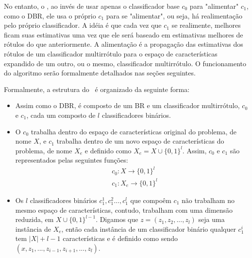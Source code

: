 No entanto, o \MRLMa, ao invés de usar apenas o classificador base $c_0$ para "alimentar" $c_1$, como o DBR,
ele usa o próprio $c_1$ para se "alimentar", ou seja, há realimentação pelo próprio classificador.
A idéia é que cada vez que $c_1$ se realimente, melhores ficam suas estimativas uma vez que ele será baseado
em estimativas melhores de rótulos do que anteriormente. 
A alimentação é a propagação das 
estimativas dos rótulos de um classificador multirrótulo para o espaço de características expandido de um outro, ou o mesmo,
classificador multirrótulo. O funcionamento do algoritmo serão formalmente detalhados nas seções seguintes.

Formalmente, a estrutura do \MRLMa~é organizado da seguinte forma:
\begin{itemize}
  \item Assim como o DBR, é composto de um BR e um classificador multirrótulo, $c_0$ e $c_1$,
  cada um composto de $l$ classificadores binários.
  \item O $c_0$ trabalha dentro do espaço de características original do problema, de nome $X$,
  e $c_1$ trabalha dentro de um novo espaço de características do problema, de nome $X_e$ e
   definido como $X_e=X \cup \{0,1\}^{l}$. Assim, $c_0$ e $c_1$ são
  representados pelas seguintes funções:
  \begin{equation}
  \begin{split}
   & c_0 : X \rightarrow \{0,1\}^l \\
   & c_1 : X_e \rightarrow \{0,1\}^l
   \end{split}
  \end{equation}
  \item Os $l$ classificadores binários $c_1^1,c_1^2...,c_1^l$ que compoêm $c_1$ não trabalham no mesmo
  espaço de características, contudo,
  trabalham com uma dimensão reduzida, em $X \cup \{0,1\}^{l-1}$. Digamos que $z=(z_1,z_2,...,z_l)$ seja uma instância de $X_e$, então cada instância 
  de um classificador binário qualquer $c_1^i$ tem $|X|+l-1$ características e é definido como sendo $(x,z_1,...,z_{i-1},z_{i+1},...,z_{l})$.

  
%   
  
\end{itemize}


